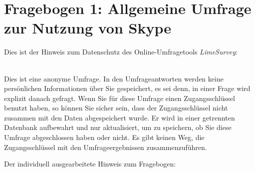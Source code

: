 
\chapter{Fragebogen 1: Allgemeine Umfrage zur Nutzung von Skype} %

\label{App:F1} %





Dies ist der Hinweis zum Datenschutz des Online-Umfragetools \textit{LimeSurvey}:

\begin{framed}\label{App1:HinweisLimeSurvey}

\\

\noindent Dies ist eine anonyme Umfrage. In den Umfrageantworten werden keine persönlichen Informationen über Sie gespeichert, es sei denn, in einer Frage wird explizit danach gefragt. Wenn Sie für diese Umfrage einen Zugangsschlüssel benutzt haben, so können Sie sicher sein, dass der Zugangsschlüssel nicht zusammen mit den Daten abgespeichert wurde. Er wird in einer getrennten Datenbank aufbewahrt und nur aktualisiert, um zu speichern, ob Sie diese Umfrage abgeschlossen haben oder nicht. Es gibt keinen Weg, die Zugangsschlüssel mit den Umfrageergebnissen zusammenzuführen.
\end{framed}


Der individuell ausgearbeitete Hinweis zum Fragebogen:


